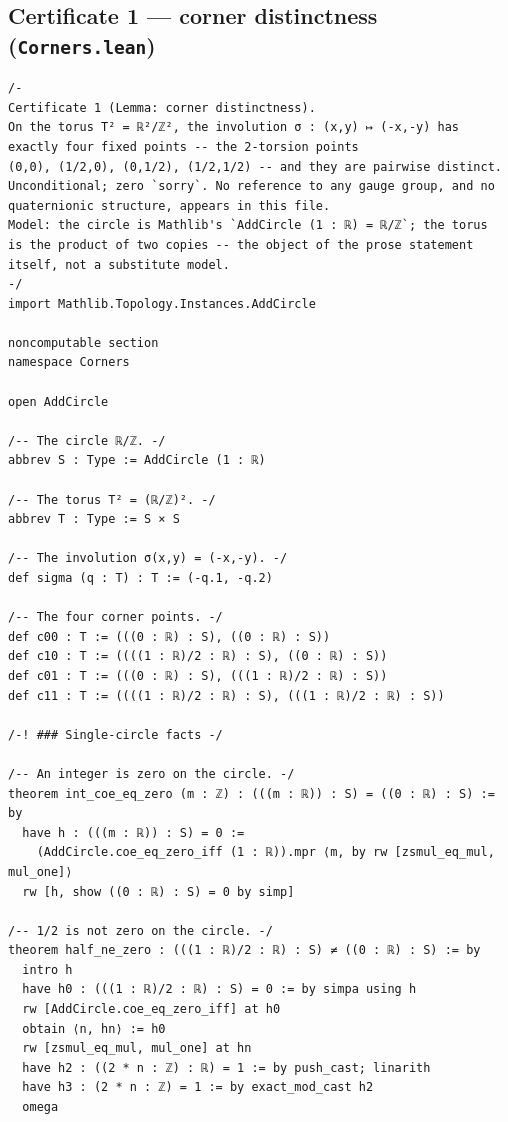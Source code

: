 \documentclass[11pt,a4paper]{article}
\theoremstyle{plain}
\theoremstyle{definition}
\theoremstyle{remark}
\begin{document}
\subsection*{Certificate 1 --- corner distinctness (\texttt{Corners.lean})}
\begin{Verbatim}[fontsize=\footnotesize,breaklines=true,breakanywhere=true,formatcom=\leanmono]
/-
Certificate 1 (Lemma: corner distinctness).
On the torus T² = ℝ²/ℤ², the involution σ : (x,y) ↦ (-x,-y) has
exactly four fixed points -- the 2-torsion points
(0,0), (1/2,0), (0,1/2), (1/2,1/2) -- and they are pairwise distinct.
Unconditional; zero `sorry`. No reference to any gauge group, and no
quaternionic structure, appears in this file.
Model: the circle is Mathlib's `AddCircle (1 : ℝ) = ℝ/ℤ`; the torus
is the product of two copies -- the object of the prose statement
itself, not a substitute model.
-/
import Mathlib.Topology.Instances.AddCircle

noncomputable section
namespace Corners

open AddCircle

/-- The circle ℝ/ℤ. -/
abbrev S : Type := AddCircle (1 : ℝ)

/-- The torus T² = (ℝ/ℤ)². -/
abbrev T : Type := S × S

/-- The involution σ(x,y) = (-x,-y). -/
def sigma (q : T) : T := (-q.1, -q.2)

/-- The four corner points. -/
def c00 : T := (((0 : ℝ) : S), ((0 : ℝ) : S))
def c10 : T := ((((1 : ℝ)/2 : ℝ) : S), ((0 : ℝ) : S))
def c01 : T := (((0 : ℝ) : S), (((1 : ℝ)/2 : ℝ) : S))
def c11 : T := ((((1 : ℝ)/2 : ℝ) : S), (((1 : ℝ)/2 : ℝ) : S))

/-! ### Single-circle facts -/

/-- An integer is zero on the circle. -/
theorem int_coe_eq_zero (m : ℤ) : (((m : ℝ)) : S) = ((0 : ℝ) : S) := by
  have h : (((m : ℝ)) : S) = 0 :=
    (AddCircle.coe_eq_zero_iff (1 : ℝ)).mpr ⟨m, by rw [zsmul_eq_mul, mul_one]⟩
  rw [h, show ((0 : ℝ) : S) = 0 by simp]

/-- 1/2 is not zero on the circle. -/
theorem half_ne_zero : (((1 : ℝ)/2 : ℝ) : S) ≠ ((0 : ℝ) : S) := by
  intro h
  have h0 : (((1 : ℝ)/2 : ℝ) : S) = 0 := by simpa using h
  rw [AddCircle.coe_eq_zero_iff] at h0
  obtain ⟨n, hn⟩ := h0
  rw [zsmul_eq_mul, mul_one] at hn
  have h2 : ((2 * n : ℤ) : ℝ) = 1 := by push_cast; linarith
  have h3 : (2 * n : ℤ) = 1 := by exact_mod_cast h2
  omega


\end{Verbatim}
\end{document}
